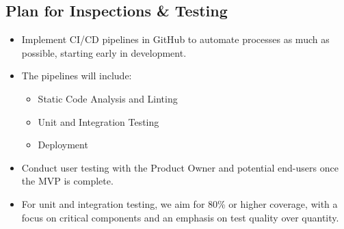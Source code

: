 \subsection{Plan for Inspections \& Testing}\label{sec:plan_for_inspections_&_testing}

\begin{itemize}
    \item Implement CI/CD pipelines in GitHub to automate processes as much as possible, starting early in development.
    \item The pipelines will include:
    \begin{itemize}
        \item Static Code Analysis and Linting
        \item Unit and Integration Testing
        \item Deployment
    \end{itemize}
    \item Conduct user testing with the Product Owner and potential end-users once the MVP is complete.
    \item For unit and integration testing, we aim for 80\% or higher coverage, with a focus on critical components and an emphasis on test quality over quantity.
\end{itemize}


\begin{comment}
    - GitOps som et sentralt konsept
    - Bruke CI/CD Pipelines i GitHubfor å automatisere så mye som mulig
    f.eks. statiske kodesjekker og inspections, unittester og integrasjonstester, også deployment for å kunne ha manuelle inspeksjoner og tester during development.
    - Linting for Go (eks. golangci-lint).
    - Plan om usertesting etter vi har MVP på plass midt i mars, jobbe utifra kravspesifikasjon og tilbakemelding fra productowner fram til det.
    
\end{comment}

